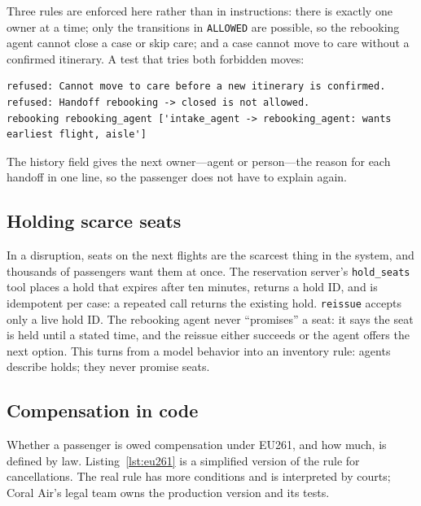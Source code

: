 

Three rules are enforced here rather than in instructions: there is exactly one owner at a time; only the transitions in \texttt{ALLOWED} are possible, so the rebooking agent cannot close a case or skip care; and a case cannot move to care without a confirmed itinerary. A test that tries both forbidden moves:
\begin{lstlisting}[language={}, numbers=none, frame=none, xleftmargin=1.5em]
refused: Cannot move to care before a new itinerary is confirmed.
refused: Handoff rebooking -> closed is not allowed.
rebooking rebooking_agent ['intake_agent -> rebooking_agent: wants earliest flight, aisle']
\end{lstlisting}
The history field gives the next owner---agent or person---the reason for each handoff in one line, so the passenger does not have to explain again.

\subsection{Holding scarce seats}

In a disruption, seats on the next flights are the scarcest thing in the system, and thousands of passengers want them at once. The reservation server's \texttt{hold\_seats} tool places a hold that expires after ten minutes, returns a hold ID, and is idempotent per case: a repeated call returns the existing hold. \texttt{reissue} accepts only a live hold ID. The rebooking agent never ``promises'' a seat: it says the seat is held until a stated time, and the reissue either succeeds or the agent offers the next option. This turns  from a model behavior into an inventory rule: agents describe holds; they never promise seats.

\subsection{Compensation in code}

Whether a passenger is owed compensation under EU261, and how much, is defined by law. Listing~\ref{lst:eu261} is a simplified version of the rule for cancellations. The real rule has more conditions and is interpreted by courts; Coral Air's legal team owns the production version and its tests.



